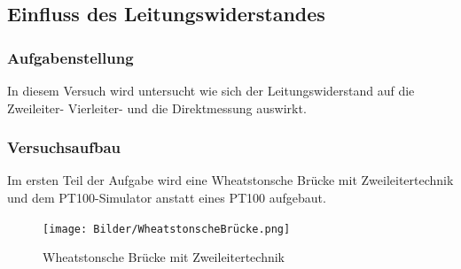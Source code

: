 \documentclass[a4paper,11pt,oneside]{article}
\begin{document}
\subsection{Einfluss des Leitungswiderstandes}
\subsubsection{Aufgabenstellung}
In diesem Versuch wird untersucht wie sich der Leitungswiderstand auf die Zweileiter- Vierleiter- und die Direktmessung auswirkt.
\subsubsection{Versuchsaufbau}
Im ersten Teil der Aufgabe wird eine Wheatstonsche Brücke mit Zweileitertechnik und dem PT100-Simulator anstatt eines PT100 aufgebaut.
\begin{center}
\begin{figure}[h]
\centering
\texttt{[image: Bilder/WheatstonscheBrücke.png]}
\caption{Wheatstonsche  Brücke mit Zweileitertechnik}
\end{figure}
\end{center}
\end{document}
